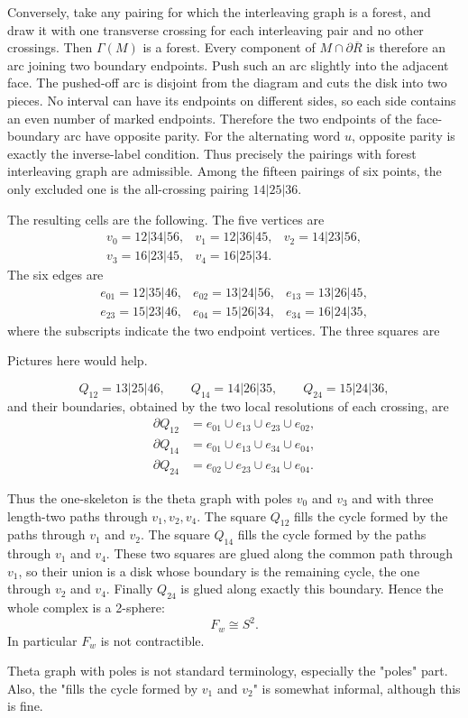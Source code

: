\documentclass[12pt]{article}
\newcommand{\review}[1]{\begin{reviewbox}#1\end{reviewbox}}
\begin{document}
Conversely, take any pairing for which the interleaving graph is a
forest, and draw it with one transverse crossing for each interleaving
pair and no other crossings.  Then \(\Gamma(M)\) is a forest.  Every
component of \(M\cap\partial\overline R\) is therefore an arc joining
two boundary endpoints.  Push such an arc slightly into the adjacent
face.  The pushed-off arc is disjoint from the diagram and cuts the disk
into two pieces.  No interval can have its endpoints on different sides,
so each side contains an even number of marked endpoints.  Therefore
the two endpoints of the face-boundary arc have opposite parity.  For
the alternating word \(u\), opposite parity is exactly the inverse-label
condition.  Thus precisely the pairings with forest interleaving graph
are admissible.  Among the fifteen pairings of six points, the only
excluded one is the all-crossing pairing \(14|25|36\).

The resulting cells are the following.  The five vertices are
\[
\begin{array}{lll}
v_0=12|34|56, & v_1=12|36|45, & v_2=14|23|56,\\
v_3=16|23|45, & v_4=16|25|34. &
\end{array}
\]
The six edges are
\[
\begin{array}{lll}
e_{01}=12|35|46, & e_{02}=13|24|56, & e_{13}=13|26|45,\\
e_{23}=15|23|46, & e_{04}=15|26|34, & e_{34}=16|24|35,
\end{array}
\]
where the subscripts indicate the two endpoint vertices.  The three
squares are
\review{Pictures here would help.}
\[
        Q_{12}=13|25|46,\qquad
        Q_{14}=14|26|35,\qquad
        Q_{24}=15|24|36,
\]
and their boundaries, obtained by the two local resolutions of each
crossing, are
\[
\begin{aligned}
\partial Q_{12}&=e_{01}\cup e_{13}\cup e_{23}\cup e_{02},\\
\partial Q_{14}&=e_{01}\cup e_{13}\cup e_{34}\cup e_{04},\\
\partial Q_{24}&=e_{02}\cup e_{23}\cup e_{34}\cup e_{04}.
\end{aligned}
\]

Thus the one-skeleton is the theta graph with poles \(v_0\) and \(v_3\)
and with three length-two paths through \(v_1,v_2,v_4\).  The square
\(Q_{12}\) fills the cycle formed by the paths through \(v_1\) and
\(v_2\).  The square \(Q_{14}\) fills the cycle formed by the paths
through \(v_1\) and \(v_4\).  These two squares are glued along the
common path through \(v_1\), so their union is a disk whose boundary is
the remaining cycle, the one through \(v_2\) and \(v_4\).  Finally
\(Q_{24}\) is glued along exactly this boundary.  Hence the whole
complex is a 2-sphere:
\[
        F_w \cong S^2 .
\]
In particular \(F_w\) is not contractible.

\review{Theta graph with poles is not standard terminology, especially the "poles" part. Also, the "fills the cycle formed by $v_1$ and $v_2$" is somewhat informal, although this is fine.}
\end{document}
